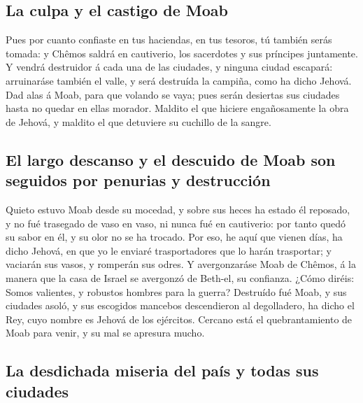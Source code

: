\hypertarget{la-culpa-y-el-castigo-de-moab}{%
\subsection{La culpa y el castigo de
Moab}\label{la-culpa-y-el-castigo-de-moab}}

 Pues por cuanto confiaste en tus haciendas, en tus
tesoros, tú también serás tomada: y Chêmos saldrá en cautiverio, los
sacerdotes y sus príncipes juntamente.  Y vendrá
destruidor á cada una de las ciudades, y ninguna ciudad escapará:
arruinaráse también el valle, y será destruída la campiña, como ha dicho
Jehová.  Dad alas á Moab, para que volando se vaya; pues
serán desiertas sus ciudades hasta no quedar en ellas morador.
 Maldito el que hiciere engañosamente la obra de Jehová,
y maldito el que detuviere su cuchillo de la sangre.

\hypertarget{el-largo-descanso-y-el-descuido-de-moab-son-seguidos-por-penurias-y-destrucciuxf3n}{%
\subsection{El largo descanso y el descuido de Moab son seguidos por
penurias y
destrucción}\label{el-largo-descanso-y-el-descuido-de-moab-son-seguidos-por-penurias-y-destrucciuxf3n}}

 Quieto estuvo Moab desde su mocedad, y sobre sus heces
ha estado él reposado, y no fué trasegado de vaso en vaso, ni nunca fué
en cautiverio: por tanto quedó su sabor en él, y su olor no se ha
trocado.  Por eso, he aquí que vienen días, ha dicho
Jehová, en que yo le enviaré trasportadores que lo harán trasportar; y
vaciarán sus vasos, y romperán sus odres.  Y
avergonzaráse Moab de Chêmos, á la manera que la casa de Israel se
avergonzó de Beth-el, su confianza.  ¿Cómo diréis: Somos
valientes, y robustos hombres para la guerra?  Destruído
fué Moab, y sus ciudades asoló, y sus escogidos mancebos descendieron al
degolladero, ha dicho el Rey, cuyo nombre es Jehová de los ejércitos.
 Cercano está el quebrantamiento de Moab para venir, y su
mal se apresura mucho.

\hypertarget{la-desdichada-miseria-del-pauxeds-y-todas-sus-ciudades}{%
\subsection{La desdichada miseria del país y todas sus
ciudades}\label{la-desdichada-miseria-del-pauxeds-y-todas-sus-ciudades}}

